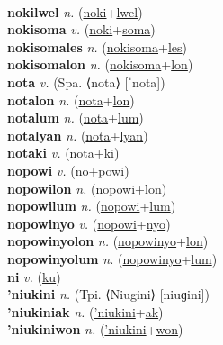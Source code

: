  \label{nokilyot} \\
\textbf{nokilwel} \textit{n.} (\hyperref[noki]{noki}+\hyperref[lwel]{lwel})
 \label{nokilwel} \\
\textbf{nokisoma} \textit{v.} (\hyperref[noki]{noki}+\hyperref[soma]{soma})
 \label{nokisoma} \\
\textbf{nokisomales} \textit{n.} (\hyperref[nokisoma]{nokisoma}+\hyperref[les]{les})
 \label{nokisomales} \\
\textbf{nokisomalon} \textit{n.} (\hyperref[nokisoma]{nokisoma}+\hyperref[lon]{lon})
 \label{nokisomalon} \\
\textbf{nota} \textit{v.} (Spa. ⟨nota⟩ [ˈnota])
 \label{nota} \\
\textbf{notalon} \textit{n.} (\hyperref[nota]{nota}+\hyperref[lon]{lon})
 \label{notalon} \\
\textbf{notalum} \textit{n.} (\hyperref[nota]{nota}+\hyperref[lum]{lum})
 \label{notalum} \\
\textbf{notalyan} \textit{n.} (\hyperref[nota]{nota}+\hyperref[lyan]{lyan})
 \label{notalyan} \\
\textbf{notaki} \textit{v.} (\hyperref[nota]{nota}+\hyperref[ki]{ki})
 \label{notaki} \\
\textbf{nopowi} \textit{v.} (\hyperref[no]{no}+\hyperref[powi]{powi})
 \label{nopowi} \\
\textbf{nopowilon} \textit{n.} (\hyperref[nopowi]{nopowi}+\hyperref[lon]{lon})
 \label{nopowilon} \\
\textbf{nopowilum} \textit{n.} (\hyperref[nopowi]{nopowi}+\hyperref[lum]{lum})
 \label{nopowilum} \\
\textbf{nopowinyo} \textit{v.} (\hyperref[nopowi]{nopowi}+\hyperref[nyo]{nyo})
 \label{nopowinyo} \\
\textbf{nopowinyolon} \textit{n.} (\hyperref[nopowinyo]{nopowinyo}+\hyperref[lon]{lon})
 \label{nopowinyolon} \\
\textbf{nopowinyolum} \textit{n.} (\hyperref[nopowinyo]{nopowinyo}+\hyperref[lum]{lum})
 \label{nopowinyolum} \\
\textbf{ni} \textit{v.} (\hyperref[ku]{\sout{ku}})
 \label{ni} \\
\textbf{'niukini} \textit{n.} (Tpi. ⟨Niugini⟩ [niuɡini])
 \label{'niukini} \\
\textbf{'niukiniak} \textit{n.} (\hyperref['niukini]{'niukini}+\hyperref[ak]{ak})
 \label{'niukiniak} \\
\textbf{'niukiniwon} \textit{n.} (\hyperref['niukini]{'niukini}+\hyperref[won]{won})
 \label{'niukiniwon} \\
